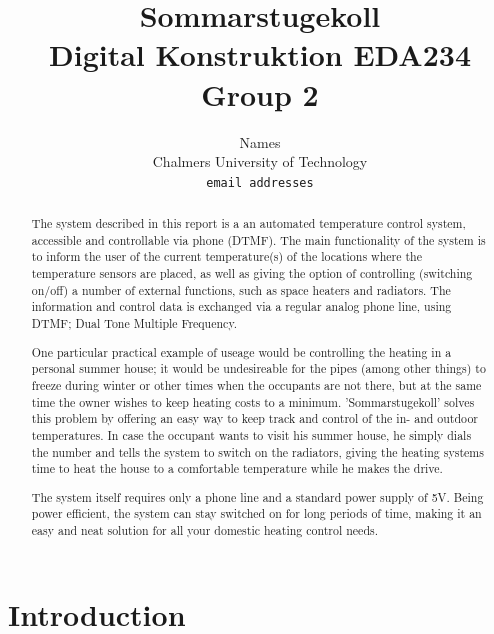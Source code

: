 \documentclass[a4paper,11pt]{article}
\begin{document}
\title{Sommarstugekoll \\
	Digital Konstruktion EDA234 \\ Group 2}
\author{Names \\
   Chalmers University of Technology \\
   \texttt{email addresses}}

\maketitle

\pagebreak

\tableofcontents

\pagebreak

\begin{abstract}
	The system described in this report is a an automated temperature control system, accessible and controllable
	via phone (DTMF). The main functionality of the system is to inform the user of the current temperature(s) of the 
	locations where the temperature sensors are placed, as well as giving the option of controlling (switching on/off)
	a number of external functions, such as space heaters and radiators. The information and control data is exchanged
	via a regular analog phone line, using DTMF; Dual Tone Multiple Frequency.

	One particular practical example of useage would be controlling the heating in a personal summer house; it would be
	undesireable for the pipes (among other things) to freeze during winter or other times when the occupants are not
	there, but at the same time the owner wishes to keep heating costs to a minimum.
	'Sommarstugekoll' solves this problem by offering an easy way to keep track and control of the in- and outdoor temperatures.
	In case the occupant wants to visit his summer house, he simply dials the number and tells the system to switch on 
	the radiators, giving the heating systems time to heat the house to a comfortable temperature while he makes the drive.

	The system itself requires only a phone line and a standard power supply of 5V. Being power efficient, the system can stay
	switched on for long periods of time, making it an easy and neat solution for all your domestic heating control needs.
\end{abstract}

\section{Introduction}
\end{document}
